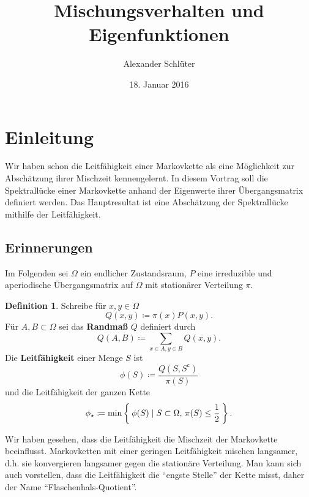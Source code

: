 \documentclass[a4paper,11pt]{scrartcl}
\theoremstyle{plain}
\theoremstyle{definition}
\newtheorem{defn}[thm]{Definition}
\newcommand{\stcomp}[1]{{#1}^{\mathsf{c}}} %
\begin{document}
\title{Mischungsverhalten und Eigenfunktionen}
\author{Alexander Schlüter}
\date{18. Januar 2016}
\maketitle

\section{Einleitung}
Wir haben schon die Leitfähigkeit einer Markovkette als eine Möglichkeit zur
Abschätzung ihrer Mischzeit kennengelernt. In diesem Vortrag soll die
Spektrallücke einer Markovkette anhand der Eigenwerte ihrer Übergangsmatrix
definiert werden. Das Hauptresultat ist eine Abschätzung der Spektrallücke
mithilfe der Leitfähigkeit.

\subsection{Erinnerungen}
Im Folgenden sei $\Omega$ ein endlicher Zustandsraum, $P$ eine irreduzible und
aperiodische Übergangsmatrix auf $\Omega$ mit stationärer Verteilung $\pi$.
\begin{defn}
 Schreibe für $x, y\in\Omega$ 
 \begin{equation*}
  Q(x,y)\coloneqq\pi(x)P(x,y).
 \end{equation*}
 Für $A, B\subset\Omega$ sei das \textbf{Randmaß} $Q$ definiert durch
 \begin{equation*}
   Q(A,B)\coloneqq\sum_{x\in A, y\in B}Q(x,y). 
 \end{equation*}
 Die \textbf{Leitfähigkeit} einer Menge $S$ ist
 \begin{equation*}
  \phi(S)\coloneqq\frac{Q(S,\stcomp{S})}{\pi(S)} 
 \end{equation*}
 und die Leitfähigkeit der ganzen Kette
 \begin{equation*}
  \phi_\star\coloneqq\min\Set{\phi(S)\mid S\subset\Omega,\,\pi(S)\leq\frac{1}{2}}.
 \end{equation*}
\end{defn}
Wir haben gesehen, dass die Leitfähigkeit die Mischzeit der Markovkette
beeinflusst. Markovketten mit einer geringen Leitfähigkeit mischen langsamer,
d.h. sie konvergieren langsamer gegen die stationäre Verteilung. Man kann sich
auch vorstellen, dass die Leitfähigkeit die ``engste Stelle'' der Kette misst,
daher der Name ``Flaschenhals-Quotient''.
\end{document}
